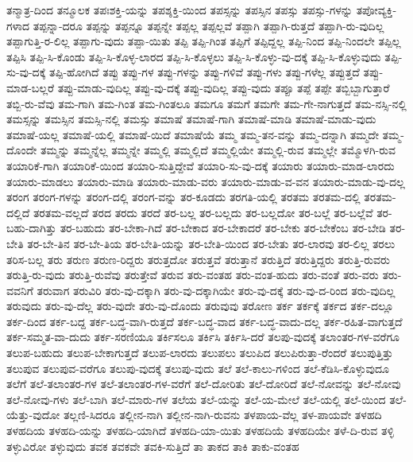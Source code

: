 {ತನ್ಮಾತ್ರ-ದಿಂದ
ತನ್ಮೂಲಕ
ತಪಃಶಕ್ತಿ-ಯನ್ನು
ತಪಶ್ಶಕ್ತಿ-ಯಿಂದ
ತಪಸ್ಸನ್ನು
ತಪಸ್ಸಿನ
ತಪಸ್ಸು
ತಪಸ್ಸು-ಗಳನ್ನು
ತಪೋವ್ಯಕ್ತಿ-ಗಳಾದ
ತಪ್ಪನ್ನಾ-ದರೂ
ತಪ್ಪನ್ನು
ತಪ್ಪನ್ನೂ
ತಪ್ಪನ್ನೇ
ತಪ್ಪಲ್ಲ
ತಪ್ಪಲ್ಲವೆ
ತಪ್ಪಾಗಿ
ತಪ್ಪಾಗಿ-ರುತ್ತದೆ
ತಪ್ಪಾಗಿ-ರು-ವುದಿಲ್ಲ
ತಪ್ಪಾಗುತ್ತಿ-ರ-ಲಿಲ್ಲ
ತಪ್ಪಾಗು-ವುದು
ತಪ್ಪಾ-ಯಿತು
ತಪ್ಪಿ
ತಪ್ಪಿ-ಗಿಂತ
ತಪ್ಪಿಗೆ
ತಪ್ಪಿದ್ದಲ್ಲ
ತಪ್ಪಿ-ನಿಂದ
ತಪ್ಪಿ-ನಿಂದಲೇ
ತಪ್ಪಿಲ್ಲ
ತಪ್ಪಿಸಿ
ತಪ್ಪಿ-ಸಿ-ಕೊಂಡು
ತಪ್ಪಿ-ಸಿ-ಕೊಳ್ಳ-ಲಾರದ
ತಪ್ಪಿ-ಸಿ-ಕೊಳ್ಳಲು
ತಪ್ಪಿ-ಸಿ-ಕೊಳ್ಳು-ವು-ದಕ್ಕೆ
ತಪ್ಪಿ-ಸಿ-ಕೊಳ್ಳುವುದು
ತಪ್ಪಿ-ಸು-ವು-ದಕ್ಕೆ
ತಪ್ಪಿ-ಹೋಗಿದೆ
ತಪ್ಪು
ತಪ್ಪು-ಗಳ
ತಪ್ಪು-ಗಳನ್ನು
ತಪ್ಪು-ಗಳಿವೆ
ತಪ್ಪು-ಗಳು
ತಪ್ಪು-ಗಳೆಲ್ಲ
ತಪ್ಪುತ್ತದೆ
ತಪ್ಪು-ಮಾಡ-ಬಲ್ಲರೆ
ತಪ್ಪು-ಮಾಡು-ವುದಿಲ್ಲ
ತಪ್ಪು-ವು-ದಕ್ಕೆ
ತಪ್ಪು-ವುದಿಲ್ಲ
ತಪ್ಪು-ವುದು
ತಪ್ಪೂ
ತಪ್ಪೆ
ತಪ್ಪೇ
ತಬ್ಬಿಬ್ಬಾಗುತ್ತಾರೆ
ತಬ್ಬಿ-ರು-ವೆವು
ತಮ-ಗಾಗಿ
ತಮ-ಗಿಂತ
ತಮ-ಗಿಂತಲೂ
ತಮಗೂ
ತಮಗೆ
ತಮಗೇ
ತಮ-ಗೇ-ನಾಗುತ್ತದೆ
ತಮ-ನಸ್ಸಿ-ನಲ್ಲಿ
ತಮಸ್ಸನ್ನು
ತಮಸ್ಸಿನ
ತಮಸ್ಸಿ-ನಲ್ಲಿ
ತಮಸ್ಸು
ತಮಾಷೆ
ತಮಾಷೆ-ಗಾಗಿ
ತಮಾಷೆ-ಮಾಡಿ
ತಮಾಷೆ-ಮಾಡು-ವುದು
ತಮಾಷೆ-ಯಲ್ಲ
ತಮಾಷೆ-ಯಲ್ಲಿ
ತಮಾಷೆ-ಯಿದೆ
ತಮಾಷೆಯೆ
ತಮ್ಮ
ತಮ್ಮ-ತನ-ವನ್ನು
ತಮ್ಮ-ದನ್ನಾಗಿ
ತಮ್ಮದೇ
ತಮ್ಮ-ದೊಂದೇ
ತಮ್ಮನ್ನು
ತಮ್ಮನ್ನೆಲ್ಲ
ತಮ್ಮನ್ನೇ
ತಮ್ಮಲ್ಲಿ
ತಮ್ಮಲ್ಲಿದೆ
ತಮ್ಮಲ್ಲಿಯೇ
ತಮ್ಮಲ್ಲಿ-ರುವ
ತಮ್ಮಲ್ಲೇ
ತಮ್ಮೊಳಗಿ-ರುವ
ತಯಾರಿಕೆ-ಗಾಗಿ
ತಯಾರಿಕೆ-ಯಿಂದ
ತಯಾರಿ-ಸುತ್ತಿದ್ದೇವೆ
ತಯಾರಿ-ಸು-ವು-ದಕ್ಕೆ
ತಯಾರು
ತಯಾರು-ಮಾಡ-ಲಾರದು
ತಯಾರು-ಮಾಡಲು
ತಯಾರು-ಮಾಡಿ
ತಯಾರು-ಮಾಡು-ವರು
ತಯಾರು-ಮಾಡು-ವ-ವನ
ತಯಾರು-ಮಾಡು-ವು-ದಲ್ಲ
ತರಂಗ
ತರಂಗ-ಗಳನ್ನು
ತರಂಗ-ದಲ್ಲಿ
ತರಂಗ-ವನ್ನು
ತರ-ಕೂಡದು
ತರಗತಿ-ಯಲ್ಲಿ
ತರತಮ
ತರತಮ-ದಲ್ಲಿ
ತರತಮ-ದಲ್ಲಿದೆ
ತರತಮ-ವಲ್ಲದೆ
ತರದ
ತರದು
ತರದೆ
ತರ-ಬಲ್ಲ
ತರ-ಬಲ್ಲದು
ತರ-ಬಲ್ಲದೋ
ತರ-ಬಲ್ಲೆ
ತರ-ಬಲ್ಲೆವೆ
ತರ-ಬಹು-ದಾಗಿತ್ತು
ತರ-ಬಹುದು
ತರ-ಬೇಕಾ-ಗಿದೆ
ತರ-ಬೇಕಾದ
ತರ-ಬೇಕಾದರೆ
ತರ-ಬೇಕು
ತರ-ಬೇಕೆಂಬ
ತರ-ಬೇಡಿ
ತರ-ಬೇತಿ
ತರ-ಬೇ-ತಿನ
ತರ-ಬೇ-ತಿಯ
ತರ-ಬೇತಿ-ಯನ್ನು
ತರ-ಬೇತಿ-ಯಿಂದ
ತರ-ಬೇತು
ತರ-ಲಾರವು
ತರ-ಲಿಲ್ಲ
ತರಲು
ತರಿಸ-ಬಲ್ಲ
ತರು
ತರುಣ
ತರುಣ-ರಿದ್ದರು
ತರುತ್ತದೋ
ತರುತ್ತವೆ
ತರುತ್ತಾನೆ
ತರುತ್ತಿದೆ
ತರುತ್ತಿದ್ದರು
ತರುತ್ತಿ-ರುವರು
ತರುತ್ತಿ-ರು-ವುದು
ತರುತ್ತಿ-ರುವೆವು
ತರುತ್ತೇವೆ
ತರುವ
ತರು-ವಂತಹ
ತರು-ವಂತ-ಹುದು
ತರು-ವಂತೆ
ತರು-ವರು
ತರು-ವವನಿಗೆ
ತರುವಾಗ
ತರುವಿರಿ
ತರು-ವು-ದಕ್ಕಾಗಿ
ತರು-ವು-ದಕ್ಕಾಗಿಯೇ
ತರು-ವು-ದಕ್ಕೆ
ತರು-ವು-ದ-ರಿಂದ
ತರು-ವುದಿಲ್ಲ
ತರುವುದು
ತರು-ವು-ದೆಲ್ಲ
ತರು-ವುದೇ
ತರು-ವು-ದೊಂದು
ತರುವುವು
ತರೋಣ
ತರ್ಕ
ತರ್ಕಕ್ಕೆ
ತರ್ಕದ
ತರ್ಕ-ದಲ್ಲೂ
ತರ್ಕ-ದಿಂದ
ತರ್ಕ-ಬದ್ದ
ತರ್ಕ-ಬದ್ಧ-ವಾಗಿ-ರುತ್ತದೆ
ತರ್ಕ-ಬದ್ಧ-ವಾದ
ತರ್ಕ-ಬದ್ಧ-ವಾದು-ದಲ್ಲ
ತರ್ಕ-ರಹಿತ-ವಾಗುತ್ತದೆ
ತರ್ಕ-ಸಮ್ಮತ-ವಾ-ದುದು
ತರ್ಕ-ಸರಣಿಯೂ
ತರ್ಕಿಸಲೂ
ತರ್ಕಿಸಿ
ತರ್ಕಿಸಿ-ದರೆ
ತಲಪು-ವುದಕ್ಕೆ
ತಲಾಂತರ-ಗಳ-ವರೆಗೂ
ತಲುಪ-ಬಹುದು
ತಲುಪ-ಬೇಕಾಗುತ್ತದೆ
ತಲುಪ-ಲಾರದು
ತಲುಪಲು
ತಲುಪಿದ
ತಲುಪಿರುತ್ತಾ-ರೆಂದರೆ
ತಲುಪುತ್ತಿತ್ತು
ತಲುಪುವ
ತಲುಪುವ-ವರೆಗೂ
ತಲುಪು-ವುದಕ್ಕೆ
ತಲುಪು-ವುದು
ತಲೆ
ತಲೆ-ಕಾಲು-ಗಳಿಂದ
ತಲೆ-ಕೆಡಿಸಿ-ಕೊಳ್ಳುವುದೂ
ತಲೆಗೆ
ತಲೆ-ತಲಾಂತರ-ಗಳ
ತಲೆ-ತಲಾಂತರ-ಗಳ-ವರೆಗೆ
ತಲೆ-ದೋರಿತು
ತಲೆ-ದೋರಿದೆ
ತಲೆ-ನೋವನ್ನು
ತಲೆ-ನೋವು
ತಲೆ-ನೋವು-ಗಳು
ತಲೆ-ಬಾಗಿ
ತಲೆ-ಮಾರು-ಗಳ
ತಲೆಯ
ತಲೆ-ಯನ್ನು
ತಲೆ-ಯ-ಮೇಲೆ
ತಲೆ-ಯಲ್ಲಿ
ತಲೆ-ಯಿಂದ
ತಲೆ-ಯೆತ್ತು-ವುದೋ
ತಲ್ಲಣಿ-ಸಿದರೂ
ತಲ್ಲೀನ-ನಾಗಿ
ತಲ್ಲೀನ-ನಾಗಿ-ರುವನು
ತಳಪಾಯ-ವೆಲ್ಲ
ತಳ-ಪಾಯವೇ
ತಳಹದಿ
ತಳಹದಿಯ
ತಳಹದಿ-ಯನ್ನು
ತಳಹದಿ-ಯಾಗಿದೆ
ತಳಹದಿ-ಯಾ-ಯಿತು
ತಳಹದಿಯೆ
ತಳಹದಿಯೇ
ತಳೆ-ದಿ-ರುವ
ತಳ್ಳಿ
ತಳ್ಳುವಿರೋ
ತಳ್ಳುವುದು
ತವಕ
ತವಕವೇ
ತವಕಿ-ಸುತ್ತಿದೆ
ತಾ
ತಾಕದ
ತಾಕಿ
ತಾಕು-ವಂತಹ
}
